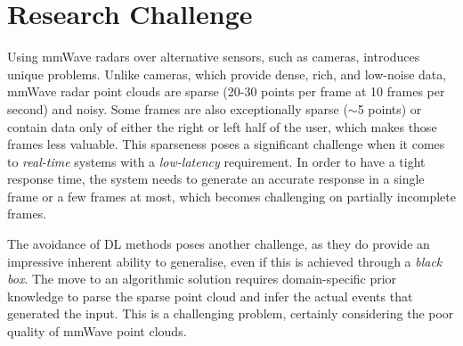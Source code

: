 \section{Research Challenge}
\label{section: introduction - research challenge}


Using mmWave radars over alternative sensors, such as cameras, introduces unique problems.
Unlike cameras, which provide dense, rich, and low-noise data, mmWave radar point clouds are sparse (20-30 points per frame at 10 frames per second) and noisy.
Some frames are also exceptionally sparse ($\sim$5 points) or contain data only of either the right or left half of the user, which makes those frames less valuable.
This sparseness poses a significant challenge when it comes to \textit{real-time}  systems with a \textit{low-latency} requirement.
In order to have a tight response time, the system needs to generate an accurate response in a single frame or a few frames at most, which becomes challenging on partially incomplete frames.

The avoidance of DL methods poses another challenge, as they do provide an impressive inherent ability to generalise, even if this is achieved through a \textit{black box}.
The move to an algorithmic solution requires domain-specific prior knowledge to parse the sparse point cloud and infer the actual events that generated the input.
This is a challenging problem, certainly considering the poor quality of mmWave point clouds.

